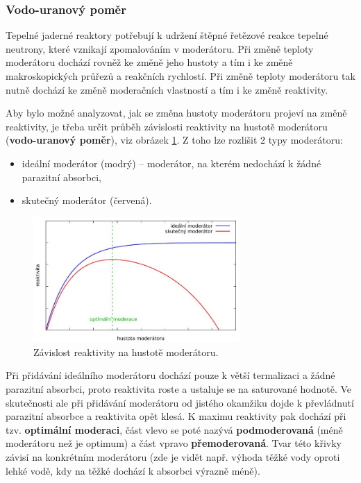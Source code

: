 \subsubsection{Vodo-uranový poměr}

Tepelné jaderné reaktory potřebují k udržení štěpné řetězové reakce tepelné neutrony, které vznikají zpomalováním v moderátoru. Při změně teploty moderátoru dochází rovněž ke změně jeho hustoty a tím i ke změně makroskopických průřezů a reakčních rychlostí. Při změně teploty moderátoru tak nutně dochází ke změně moderačních vlastností a tím i ke změně reaktivity.

Aby bylo možné analyzovat, jak se změna hustoty moderátoru projeví na změně reaktivity, je třeba určit průběh závislosti reaktivity na hustotě moderátoru (\textbf{vodo-uranový poměr}), viz obrázek \ref{voda-uran}. Z toho lze rozlišit 2 typy moderátoru:

\begin{itemize}
  \item ideální moderátor (modrý) -- moderátor, na kterém nedochází k žádné parazitní absorbci,
  \item skutečný moderátor (červená).
\end{itemize}

\begin{figure}[H]
  \centering
  \includegraphics[width=0.7\textwidth]{img/voda-uran.JPG}
  \caption{Závislost reaktivity na hustotě moderátoru.}
  \label{voda-uran}
\end{figure}

Při přidávání ideálního moderátoru dochází pouze k větší termalizaci a žádné parazitní absorbci, proto reaktivita roste a ustaluje se na saturované hodnotě. Ve skutečnosti ale při přidávání moderátoru od jistého okamžiku dojde k převládnutí parazitní absorbce a reaktivita opět klesá. K maximu reaktivity pak dochází při tzv. \textbf{optimální moderaci}, část vlevo se poté nazývá \textbf{podmoderovaná} (méně moderátoru než je optimum) a část vpravo \textbf{přemoderovaná}. Tvar této křivky závisí na konkrétním moderátoru (zde je vidět např. výhoda těžké vody oproti lehké vodě, kdy na těžké dochází k absorbci výrazně méně).

